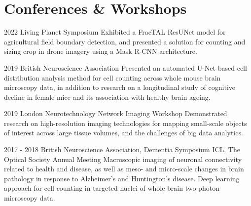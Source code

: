 \documentclass[9pt]{extarticle} %
\begin{document}


\section{Conferences \& Workshops}

\conference
{2022}
{Living Planet Symposium}
{Exhibited a FracTAL ResUNet model for agricultural field boundary detection, and presented a solution for counting and sizing crop in drone imagery using a Mask R-CNN architecture.}

\conference
{2019}
{British Neuroscience Association}
{Presented an automated U-Net based cell distribution analysis method for cell counting across whole mouse brain microscopy data, in addition to research on a longitudinal study of cognitive decline in female mice and its association with healthy brain ageing.}

\conference
{2019}
{London Neurotechnology Network Imaging Workshop}
{Demonstrated research on high-resolution imaging technologies for mapping small-scale objects of interest across large tissue volumes, and the challenges of big data analytics.}

\conference
{2017 - 2018}
{British Neuroscience Association, Dementia Symposium ICL, The Optical Society Annual Meeting}
{Macroscopic imaging of neuronal connectivity related to health and disease, as well as meso- and micro-scale changes in brain pathology in response to Alzheimer's and Huntington's disease. Deep learning approach for cell counting in targeted nuclei of whole brain two-photon microscopy data.}
\end{document}
